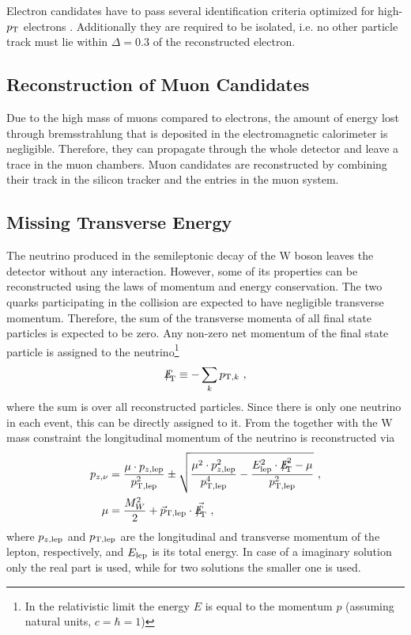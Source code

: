 \noindent Electron candidates have to pass several identification criteria optimized for high-$p_{\rm T}$ electrons \cite{elreq}. Additionally they are required to be isolated, i.e. no other particle track must lie within $\Delta=0.3$ of the reconstructed electron.
\subsection{Reconstruction of Muon Candidates}
Due to the high mass of muons compared to electrons, the amount of energy lost through bremsstrahlung that is deposited in the electromagnetic calorimeter is negligible. Therefore, they can propagate through the whole detector and leave a trace in the muon chambers. Muon candidates are reconstructed by combining their track in the silicon tracker and the entries in the muon system.  
\subsection{Missing Transverse Energy}
The neutrino produced in the semileptonic decay of the W boson leaves the detector without any interaction. However, some of its properties can be reconstructed using the laws of momentum and energy conservation. The two quarks participating in the collision are expected to have negligible transverse momentum. Therefore, the sum of the transverse momenta of all final state particles is expected to be zero. Any non-zero net momentum of the final state particle is assigned to the neutrino\footnote{In the relativistic limit the energy $E$ is equal to the momentum $p$ (assuming natural units, $c=\hbar=1$)}\cite{MET}
\begin{equation}
{E\!\!\!\!/}_{\!\mathrm{T}} \equiv -\sum_k p_{{\rm T},k} ~,
\end{equation}
where the sum is over all reconstructed particles. Since there is only one neutrino in each event, this \MET can be directly assigned to it. From the \MET together with the W mass constraint the longitudinal momentum of the neutrino is reconstructed \cite{PAS} via
\begin{align}
p_{z,\nu} &= \frac{\mu \cdot p_{z,{\rm lep}}}{p_{\rm T,lep}^2} \pm \sqrt{\frac{\mu^2 \cdot p_{z,{\rm lep}}^2}{p_{\rm T,lep}^4} - \frac{E_{\rm lep}^2 \cdot \MET^2 - \mu}{p_{\rm T,lep}^2}} ~, \\
\mu &= \frac{M_W^2}{2} + \vec{p}_{\rm T,lep}\cdot \vec{\MET} ~,
\end{align} 
where $p_{z,{\rm lep}}$ and $p_{\rm T,lep}$ are the longitudinal  and transverse momentum of the lepton, respectively, and $E_{\rm lep}$ is its total energy. In case of a imaginary solution only the real part is used, while for two solutions the smaller one is used.
